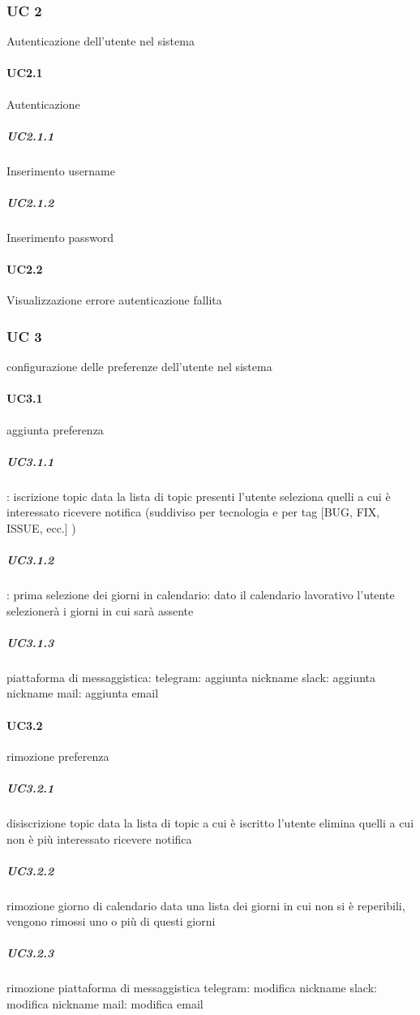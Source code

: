 \subsubsection{UC 2}
	Autenticazione dell'utente nel sistema
	\paragraph{UC2.1}
		Autenticazione
			\subparagraph{UC2.1.1}
				Inserimento username
			\subparagraph{UC2.1.2}
				Inserimento password
	\paragraph{UC2.2}
		Visualizzazione errore autenticazione fallita


\subsubsection{UC 3}
configurazione delle preferenze dell'utente nel sistema

	\paragraph{UC3.1}
	aggiunta preferenza
		\subparagraph{UC3.1.1}:
		iscrizione topic
			data la lista di topic presenti l'utente seleziona quelli a cui è interessato ricevere notifica (suddiviso per tecnologia e per tag [BUG, FIX, ISSUE, ecc.] )
		\subparagraph{UC3.1.2}:
		prima selezione dei giorni in calendario:
			dato il calendario lavorativo l'utente selezionerà i giorni in cui sarà assente
		\subparagraph{UC3.1.3}
		piattaforma di messaggistica:
			telegram: aggiunta nickname
			slack: aggiunta nickname
			mail: aggiunta email

	\paragraph{UC3.2}
	rimozione preferenza
		\subparagraph{UC3.2.1}
		disiscrizione topic %
			data la lista di topic a cui è iscritto l'utente elimina quelli a cui non è più interessato ricevere notifica
		\subparagraph{UC3.2.2}
		rimozione giorno di calendario
			data una lista dei giorni in cui non si è reperibili, vengono rimossi uno o più di questi giorni
		\subparagraph{UC3.2.3}
		rimozione piattaforma di messaggistica %
			telegram: modifica nickname
			slack: modifica nickname
			mail: modifica email
			
